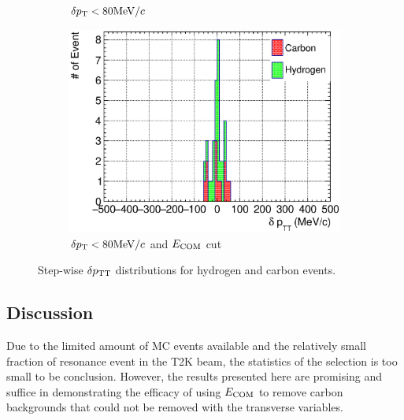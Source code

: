 \begin{figure}
\begin{subfigure}[b]{\trfigwid\textwidth}
          \caption{$\delta p_\textrm{T} < 80\textrm{MeV}/c$}
          \label{subfig:hsel-dang-dpt80}
     \end{subfigure}
     \begin{subfigure}[b]{\trfigwid\textwidth}
          \centering
          \includegraphics[width=\textwidth]{figures/perf/tki/SFGpTPCmu_dptt_stack_al15_GetH_dpt80_wdang.eps}
          \caption{$\delta p_\textrm{T} < 80\textrm{MeV}/c$ and $E_{\textrm{COM}}$ cut}
          \label{subfig:hsel-dang-dpt80-ecom}
     \end{subfigure}
     \caption{Step-wise $\delta p_\textrm{TT}$ distributions for hydrogen and carbon events.}
     \label{fig:hsel-dptt-step}
     \end{figure}

     \subsection{Discussion}
     Due to the limited amount of MC events available and the relatively small fraction of resonance event in the T2K beam, the statistics of the selection is too small to be conclusion.
     However, the results presented here are promising and suffice in demonstrating the efficacy of using $E_{\textrm{COM}}$ to remove carbon backgrounds that could not be removed with the transverse variables.

   

     
     